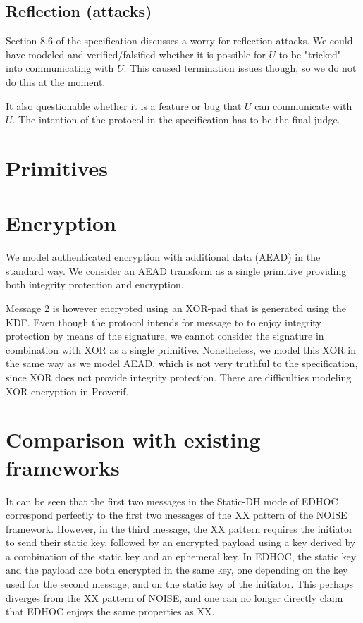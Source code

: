 \documentclass[a4paper,11pt]{article}
\theoremstyle{plain}
\theoremstyle{plain}
\begin{document}
\subsection{Reflection (attacks)}
Section 8.6 of the specification discusses a worry for reflection attacks.
%
We could have modeled and verified/falsified whether it is possible for
$U$ to be "tricked" into communicating with $U$.
%
This caused termination issues though, so we do not do this at the moment.
%

It also questionable whether it is a feature or bug that $U$ can communicate
with $U$.
%
The intention of the protocol in the specification has to be the final judge.
%

\section{Primitives}
\section{Encryption}
%
We model authenticated encryption with additional data (AEAD) in the standard
way.
%
We consider an AEAD transform as a single primitive providing both integrity
protection and encryption.
%

Message 2 is however encrypted using an XOR-pad that is generated using the KDF.
%
Even though the protocol intends for message to to enjoy integrity protection by
means of the signature, we cannot consider the signature in combination with
XOR as a single primitive.
%
Nonetheless, we model this XOR in the same way as we model AEAD, which is not very truthful
to the specification, since XOR does not provide integrity protection.
%
There are difficulties modeling XOR encryption in Proverif.
%

\section{Comparison with existing frameworks}
It can be seen that the first two messages in the Static-DH mode of EDHOC correspond perfectly to the first two messages of the XX pattern of the NOISE framework. However, in the third message, the XX pattern requires the initiator to send their static key, followed by an encrypted payload using a key derived by a combination of the static key and an ephemeral key. In EDHOC, the static key and the payload are both encrypted in the same key, one depending on the key used for the second message, and on the static key of the initiator. This perhaps diverges from the XX pattern of NOISE, and one can no longer directly claim that EDHOC enjoys the same properties as XX. 


%
%

\end{document}
